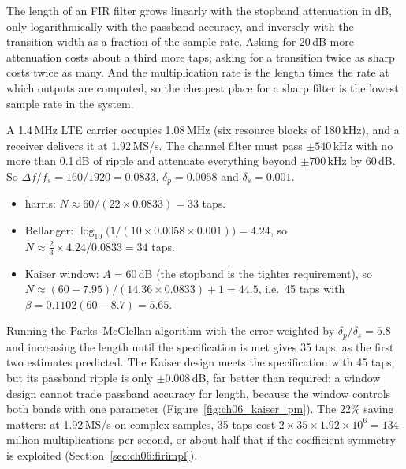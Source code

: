 \begin{keyidea}
The length of an FIR filter grows linearly with the stopband attenuation in dB, only
logarithmically with the passband accuracy, and inversely with the transition width as a fraction
of the sample rate. Asking for 20\,dB more attenuation costs about a third more taps; asking for a
transition twice as sharp costs twice as many. And the multiplication rate is the length times the
rate at which outputs are computed, so the cheapest place for a sharp filter is the lowest sample
rate in the system.
\end{keyidea}

\begin{worked}
A 1.4\,MHz LTE carrier occupies 1.08\,MHz (six resource blocks of 180\,kHz), and a receiver
delivers it at 1.92\,MS/s. The channel filter must pass $\pm540$\,kHz with no more than 0.1\,dB of
ripple and attenuate everything beyond $\pm700$\,kHz by 60\,dB. So $\Delta f/f_s=160/1920=0.0833$,
$\delta_p=0.0058$ and $\delta_s=0.001$.
\begin{itemize}
\item harris: $N\approx60/(22\times0.0833)=33$ taps.
\item Bellanger: $\log_{10}\bigl(1/(10\times0.0058\times0.001)\bigr)=4.24$, so
$N\approx\frac23\times4.24/0.0833=34$ taps.
\item Kaiser window: $A=60$\,dB (the stopband is the tighter requirement), so
$N\approx(60-7.95)/(14.36\times0.0833)+1=44.5$, i.e.\ 45 taps with $\beta=0.1102(60-8.7)=5.65$.
\end{itemize}
Running the Parks--McClellan algorithm with the error weighted by $\delta_p/\delta_s=5.8$ and
increasing the length until the specification is met gives 35 taps, as the first two estimates
predicted. The Kaiser design meets the specification with 45 taps, but its passband ripple is only
$\pm0.008$\,dB, far better than required: a window design cannot trade passband accuracy for
length, because the window controls both bands with one parameter
(Figure~\ref{fig:ch06_kaiser_pm}). The 22\% saving matters: at 1.92\,MS/s on complex samples,
35 taps cost $2\times35\times1.92\times10^6=134$ million multiplications per second, or about half
that if the coefficient symmetry is exploited (Section~\ref{sec:ch06:firimpl}).
\end{worked}

